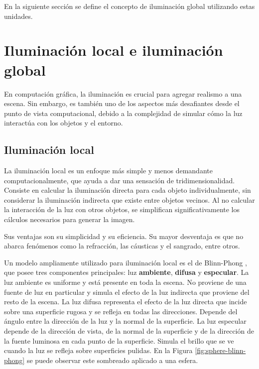 En la siguiente sección se define el concepto de iluminación global utilizando estas unidades.

\section{Iluminación local e iluminación global}\label{sec:local_vs_global}

En computación gráfica, la iluminación es crucial para agregar realismo a una escena.
Sin embargo, es también uno de los aspectos más desafiantes desde el punto de vista computacional, debido a la complejidad de simular cómo la luz interactúa con los objetos y el entorno.

\subsection{Iluminación local}

La iluminación local \cite[p.~375]{rtr} es un enfoque más simple y menos demandante computacionalmente, que ayuda a dar una sensación de tridimensionalidad.
Consiste en calcular la iluminación directa para cada objeto individualmente, sin considerar la iluminación indirecta que existe entre objetos vecinos.
Al no calcular la interacción de la luz con otros objetos, se simplifican significativamente los cálculos necesarios para generar la imagen.

Sus ventajas son su simplicidad y su eficiencia.
Su mayor desventaja es que no abarca fenómenos como la refracción, las cáusticas y el sangrado, entre otros.

Un modelo ampliamente utilizado para iluminación local es el de Blinn-Phong \cite{blinn-phong}, que posee tres componentes principales: luz \textbf{ambiente}, \textbf{difusa} y \textbf{especular}.
La luz ambiente es uniforme y está presente en toda la escena.
No proviene de una fuente de luz en particular y simula el efecto de la luz indirecta que proviene del resto de la escena.
La luz difusa representa el efecto de la luz directa que incide sobre una superficie rugosa y se refleja en todas las direcciones.
Depende del ángulo entre la dirección de la luz y la normal de la superficie.
La luz especular depende de la dirección de vista, de la normal de la superficie y de la dirección de la fuente luminosa en cada punto de la superficie.
Simula el brillo que se ve cuando la luz se refleja sobre superficies pulidas.
En la Figura \ref{fig:sphere-blinn-phong} se puede observar este sombreado aplicado a una esfera.

